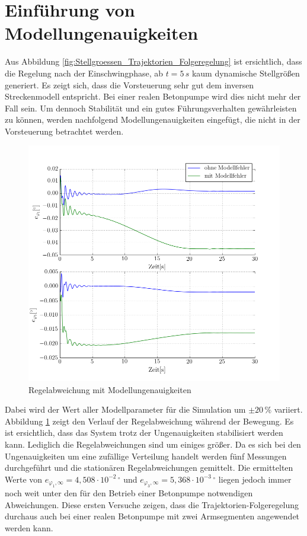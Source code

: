 \section{Einführung von Modellungenauigkeiten}
Aus Abbildung \ref{fig:Stellgroessen_Trajektorien_Folgeregelung} ist ersichtlich, dass die Regelung nach der Einschwingphase, ab $t=5\,\si{s}$ kaum dynamische Stellgrößen generiert. Es zeigt sich, dass die Vorsteuerung sehr gut dem inversen Streckenmodell entspricht. Bei einer realen Betonpumpe wird dies nicht mehr der Fall sein. Um dennoch Stabilität und ein gutes Führungsverhalten gewährleisten zu können, werden nachfolgend Modellungenauigkeiten eingefügt, die nicht in der Vorsteuerung betrachtet werden.\newline
	\begin{figure}[h!]
		\centering
		\includegraphics[scale=0.5]{Bilder/Modellungenauigkeiten.png}
		\caption{Regelabweichung mit Modellungenauigkeiten}
		\label{fig:Regelabweichung_Modellungenauigkeiten}
	\end{figure}\newline
Dabei wird der Wert aller Modellparameter für die Simulation um $\pm20 \,\%$ variiert. Abbildung \ref{fig:Regelabweichung_Modellungenauigkeiten} zeigt den Verlauf der Regelabweichung während der Bewegung. Es ist ersichtlich, dass das System trotz der Ungenauigkeiten stabilisiert werden kann. Lediglich die Regelabweichungen sind um einiges größer. Da es sich bei den Ungenauigkeiten um eine zufällige Verteilung handelt werden fünf Messungen durchgeführt und die stationären Regelabweichungen gemittelt. Die ermittelten Werte von \mbox{$e_{\varphi_1,\infty}=4,508\cdot10^{-2}\,^\circ$} und $e_{\varphi_3,\infty} = 5,368\cdot10^{-3}\,^\circ$  liegen jedoch immer noch weit unter den für den Betrieb einer Betonpumpe notwendigen Abweichungen. Diese ersten Versuche zeigen, dass die Trajektorien-Folgeregelung durchaus auch bei einer realen Betonpumpe mit zwei Armsegmenten angewendet werden kann. 

